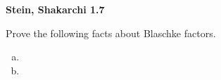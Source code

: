 \textbf{Stein, Shakarchi 1.7}

Prove the following facts about Blaschke factors.

\begin{enumerate}[(a)]
    \item 
    \pagebreak
    \item 
\end{enumerate}